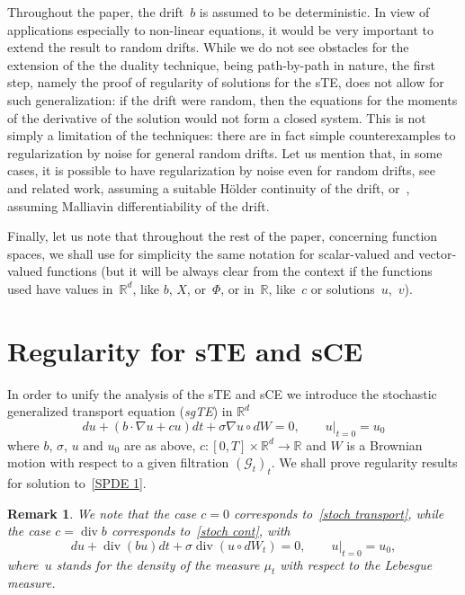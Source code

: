 \documentclass[a4paper,10pt]{article}
\newtheorem{remark}[theorem]{Remark}
\newcommand\1{\mathbbm{1}}
\newcommand{\mc}{\mathcal}
\DeclareMathOperator{\diverg}{div}
\numberwithin{equation}{section}
\begin{document}
Throughout the paper, the drift~$b$ is assumed to be deterministic. In view of applications especially to non-linear equations, it would be very important to extend the result to random drifts. While we do not see obstacles for the extension of the the duality technique, being path-by-path in nature, the first step, namely the proof of regularity of solutions for the sTE, does not allow for such generalization: if the drift were random, then the equations for the moments of the derivative of the solution would not form a closed system. This is not simply a limitation of the techniques: there are in fact simple counterexamples to regularization by noise for general random drifts. Let us mention that, in some cases, it is possible to have regularization by noise even for random drifts, see~\cite{CATGUB13} and related work, assuming a suitable H\"older continuity of the drift, or~\cite{DubRev,Oli}, assuming Malliavin differentiability of the drift.

Finally, let us note that throughout the rest of the paper, concerning function spaces, we shall use for simplicity the same notation for scalar-valued and vector-valued functions (but it will be always clear from the context if the functions used have values in~$\mathbb{R}^{d}$, like $b$, $X$,  or~$\Phi$, or in~$\mathbb{R}$, like~$c$ or solutions~$u$,~$v$).


\section{Regularity for sTE and sCE\label{section regularity}}

In order to unify the analysis of the sTE and sCE we introduce the stochastic generalized transport equation (\textit{sgTE}) in $\mathbb{R}^{d}$
\begin{equation}
\tag{sgTE}
du+(b\cdot\nabla u+cu)  dt+\sigma\nabla u\circ dW=0,\qquad
u|_{t=0}=u_{0} \label{SPDE 1} 
\end{equation}
where $b$, $\sigma$, $u$ and $u_{0}$ are as above, $c \colon [0,T] \times\mathbb{R}^{d}\rightarrow\mathbb{R}$ and $W$ is a Brownian motion with respect to a given filtration $(\mc{G}_t)_t$. We shall prove regularity results for solution to~\eqref{SPDE 1}.

\begin{remark}
We note that the case $c=0$ corresponds to~\eqref{stoch transport}, while the case $c=\diverg b$ corresponds to~\eqref{stoch cont}, with
\begin{equation}
du+\diverg  (bu)  dt+\sigma\diverg  
(  u\circ dW_{t} )  =0,\qquad u|_{t=0}=u_{0},
\label{sCE for density}
\end{equation}
where~$u$ stands for the density of the measure $\mu_t$ with respect to the Lebesgue measure.
\end{remark}
\end{document}
